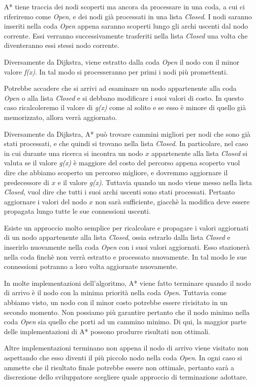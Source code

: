 \documentclass[11pt]{book}
\begin{document}
\par{
A* tiene traccia dei nodi scoperti ma ancora da processare in una coda, a cui ci riferiremo come \emph{Open}, e dei nodi gi\`a processati in una lista \emph{Closed}. I nodi saranno inseriti nella coda \emph{Open} appena saranno scoperti lungo gli archi uscenti dal nodo corrente. Essi verranno successivamente trasferiti nella lista \emph{Closed} una volta che diventeranno essi stessi nodo corrente.
}
\par{Diversamente da Dijkstra, viene estratto dalla coda \emph{Open} il nodo con il minor valore \emph{f(x)}. In tal modo si processeranno per primi i nodi pi\`u promettenti.}
\par{Potrebbe accadere che si arrivi ad esaminare un nodo appartenente alla coda \emph{Open} o alla lista \emph{Closed} e si debbano modificare i suoi valori di costo. In questo caso ricalcoleremo il valore di \emph{g(x)} come al solito e se esso \`e minore di quello gi\`a memorizzato, allora verr\`a aggiornato.}
\par{Diversamente da Dijkstra, A* pu\`o trovare cammini migliori per nodi che sono gi\`a stati processati, e che quindi si trovano nella lista \emph{Closed}. In particolare, nel caso in cui durante una ricerca si incontra un nodo $x$ appartenente alla lista \emph{Closed} si valuta se il valore \emph{g(x)} \`e maggiore del costo del percorso appena scoperto vuol dire che abbiamo scoperto un percorso migliore, e dovremmo aggiornare il predecessore di $x$ e il valore \emph{g(x)}. Tuttavia quando un nodo viene messo nella lista \emph{Closed}, vuol dire che tutti i suoi archi uscenti sono stati processati. Pertanto aggiornare i valori del nodo $x$ non sar\`a sufficiente, giacch\`e la modifica deve essere propagata lungo tutte le sue connessioni uscenti.}
\par{Esiste un approccio molto semplice per ricalcolare e propagare i valori aggiornati di un nodo appartenente alla lista \emph{Closed}, ossia estrarlo dalla lista \emph{Closed} e inserirlo nuovamente nella coda \emph{Open} con i suoi valori aggiornati. Esso stazioner\`a nella coda finch\`e non verr\`a estratto e processato nuovamente. In tal modo le sue connessioni potranno a loro volta aggiornate nuovamente.}
\par{In molte implementazioni dell'algoritmo, A* viene fatto terminare quando il nodo di arrivo \`e il nodo con la minima priorit\`a nella coda \emph{Open}. Tuttavia come abbiamo visto, un nodo con il minor costo potrebbe essere rivisitato in un secondo momento. Non possiamo pi\`u garantire pertanto che il nodo minimo nella coda \emph{Open} sia quello che porti ad un cammino minimo. Di qui, la maggior parte delle implementazioni di A* possono produrre risultati non ottimali.}
\par{Altre implementazioni terminano non appena il nodo di arrivo viene visitato non aspettando che esso diventi il pi\`u piccolo nodo nella coda \emph{Open}. In ogni caso si ammette che il risultato finale potrebbe essere non ottimale, pertanto sar\`a a discrezione dello sviluppatore scegliere quale approccio di terminazione adottare.}
\end{document}
